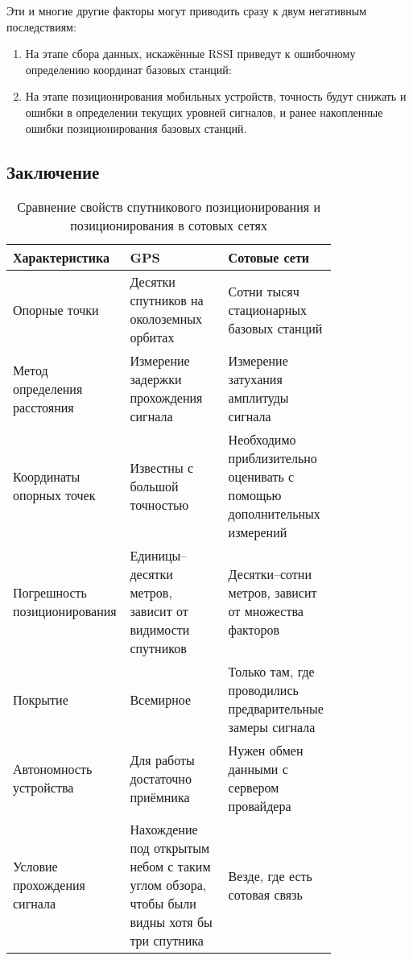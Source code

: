 Эти и многие другие факторы могут приводить сразу к двум негативным последствиям:

\begin{enumerate}
	\item
		На этапе сбора данных, искажённые RSSI приведут к ошибочному определению координат базовых станций:
	\item
		На этапе позиционирования мобильных устройств, точность будут снижать и ошибки в определении текущих уровней сигналов, и ранее накопленные ошибки позиционирования базовых станций.
\end{enumerate}

\subsection{Заключение}
\begin{table}
	\caption{\label{tab:gpsvslbs}Сравнение свойств спутникового позиционирования и позиционирования в сотовых сетях}
	\begin{center}
		\begin{tabular}{|p{0.2\linewidth}|p{0.3\linewidth}|p{0.3\linewidth}|}
			\hline
			Характеристика & GPS & Сотовые сети \\
			\hline
			Опорные точки & Десятки спутников на околоземных орбитах & Сотни тысяч стационарных базовых станций \\
			\hline
			Метод определения расстояния & Измерение задержки прохождения сигнала & Измерение затухания амплитуды сигнала \\
			\hline
			Координаты опорных точек & Известны с большой точностью & Необходимо приблизительно оценивать с помощью дополнительных измерений \\
			\hline
			Погрешность позиционирования & Единицы--десятки метров, зависит от видимости спутников & Десятки--сотни метров, зависит от множества факторов \\
			\hline
			Покрытие & Всемирное & Только там, где проводились предварительные замеры сигнала \\
			\hline
			Автономность устройства & Для работы достаточно приёмника & Нужен обмен данными с сервером провайдера \\
			\hline
			Условие прохождения сигнала & Нахождение под открытым небом с таким углом обзора, чтобы были видны хотя бы три спутника & Везде, где есть сотовая связь \\
			\hline
		\end{tabular}
	\end{center}
\end{table}

